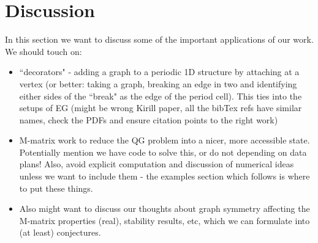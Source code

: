 \section{Discussion} \label{sec:Discussion}
In this section we want to discuss some of the important applications of our work.
We should touch on:
\begin{itemize}
	\item ``decorators" - adding a graph to a periodic 1D structure by attaching at a vertex (or better: taking a graph, breaking an edge in two and identifying either sides of the ``break" as the edge of the period cell).
	This ties into the setups of EG \cite{cherednichenko2019time} (might be wrong Kirill paper, all the bibTex refs have similar names, check the PDFs and ensure citation points to the right work)
	\item M-matrix work to reduce the QG problem into a nicer, more accessible state.
	Potentially mention we have code to solve this, or do not depending on data plans!
	Also, avoid explicit computation and discussion of numerical ideas unless we want to include them - the examples section which follows is where to put these things.
	\item Also might want to discuss our thoughts about graph symmetry affecting the M-matrix properties (real), stability results, etc, which we can formulate into (at least) conjectures.
\end{itemize}

